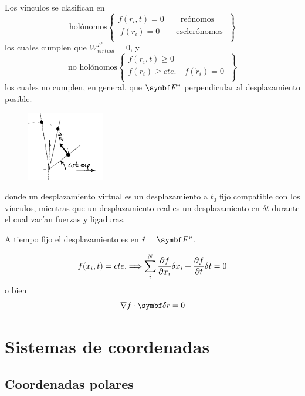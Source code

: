 \documentclass[10pt,oneside]{CBFT_book}
\begin{document}
Los vínculos se clasifican en
\[
\textrm{holónomos} 
\begin{Bmatrix}
 f(r_i,t) = 0 \qquad \textrm{reónomos} \\
\; f(r_i) = 0 \qquad \textrm{esclerónomos} \;\\
\end{Bmatrix} 
\]
los cuales cumplen que  $W_{virtual}^{F^v}=0$, y
\[
\textrm{no holónomos} 
\begin{Bmatrix}
 f(r_i,t) \geq 0  \\
 f(r_i) \geq cte. \quad f(\dot{r}_i) = 0  \; \\
\end{Bmatrix}
\]
los cuales no cumplen, en general, que $\vb{F}^v$ perpendicular al desplazamiento posible.
\begin{figure}[hbt]
	\begin{center}
	\includegraphics[width=0.3\textwidth]{images/fig_mc_vinculos3.pdf}	
	\end{center}
	\caption{}
\end{figure} 
donde un desplazamiento virtual es un desplazamiento a $t_0$ fijo compatible con los vínculos,
mientras que un desplazamiento real es un desplazamiento en $\delta t$ durante el cual varían
fuerzas y ligaduras.

A tiempo fijo el desplazamiento es en $\hat{r} \perp \vb{F}^v$.

\[
	f(x_i,t) = cte. \Longrightarrow \sum_i^N \frac{\partial^{\hspace{-0.05em}} {f}}{\partial {x_i}^{\hspace{-0.05em}}} \delta x_i + \frac{\partial^{\hspace{-0.05em}} {f}}{\partial {t}^{\hspace{-0.05em}}} \delta t = 0 
\]
o bien
\[
	\nabla f \cdot \vb{\delta r} = 0
\]

\section{Sistemas de coordenadas}

\subsection{Coordenadas polares}
\end{document}
